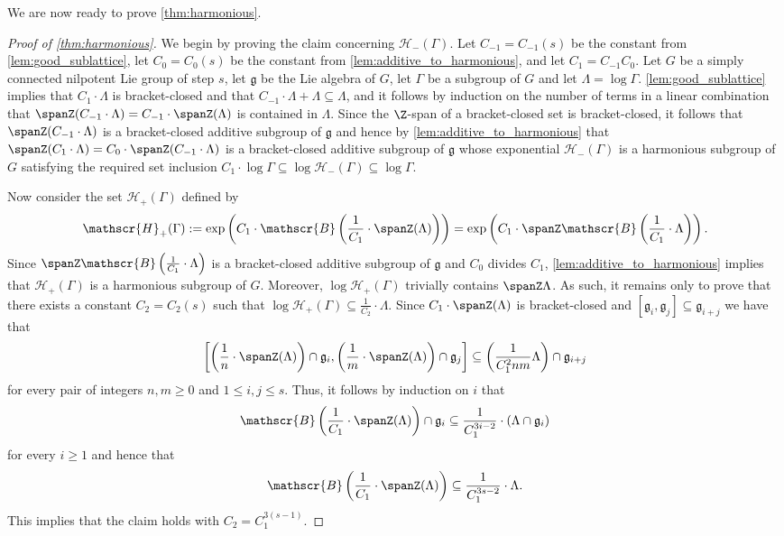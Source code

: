 We are now ready to prove \cref{thm:harmonious}.

\begin{proof}[Proof of \cref{thm:harmonious}]
We begin by proving the claim concerning $\mathscr{H}_-(\Gamma)$.
 Let $C_{-1}=C_{-1}(s)$ be the constant from \cref{lem:good_sublattice}, let $C_0=C_0(s)$ be the constant from \cref{lem:additive_to_harmonious}, and let $C_1=C_{-1}C_0$.
 Let $G$ be a simply connected nilpotent Lie group of step $s$, let $\mathfrak{g}$ be the Lie algebra of $G$, let $\Gamma$ be a subgroup of $G$ and let $\Lambda = \log \Gamma$.
  \cref{lem:good_sublattice} implies that $C_1 \cdot \Lambda$ is bracket-closed and that $C_{-1}\cdot \Lambda + \Lambda \subseteq \Lambda$, and it follows by induction on the number of terms in a linear combination that $\spanZ(C_{-1}\cdot \Lambda)=C_{-1}\cdot \spanZ(\Lambda)$ is contained in $\Lambda$. 
Since the $\Z$-span of a bracket-closed set is bracket-closed, it follows that $\spanZ(C_{-1} \cdot \Lambda)$ is a bracket-closed additive subgroup of $\mathfrak{g}$ and hence by \cref{lem:additive_to_harmonious} that $\spanZ (C_1 \cdot \Lambda)=C_0\cdot \spanZ(C_{-1}\cdot \Lambda)$ is a bracket-closed additive subgroup of $\mathfrak{g}$ whose exponential $\mathscr{H}_-(\Gamma)$ is a harmonious subgroup of $G$ satisfying the required set inclusion $C_1 \cdot \log \Gamma \subseteq \log \mathscr{H}_-(\Gamma) \subseteq \log \Gamma$.

\medskip

Now consider the set $\mathscr{H}_+(\Gamma)$ defined by
\[\mathscr{H}_+(\Gamma):=\exp\left(C_1 \cdot \mathscr{B}\left(\frac{1}{C_1} \cdot \spanZ (\Lambda)\right)\right)=\exp\left(C_1 \cdot \spanZ \mathscr{B}\left(\frac{1}{C_1} \cdot \Lambda\right)\right).\]
%
 Since $\spanZ \mathscr{B}\left(\frac{1}{C_1} \cdot \Lambda\right)$ is a bracket-closed additive subgroup of $\mathfrak{g}$ and $C_0$ divides $C_1$, \cref{lem:additive_to_harmonious} implies that $\mathscr{H}_+(\Gamma)$ is a harmonious subgroup of $G$. Moreover, $\log \mathscr{H}_+(\Gamma)$ trivially contains $\spanZ \Lambda$. As such, it remains only to prove that there exists a constant $C_2=C_2(s)$ such that $\log \mathscr{H}_+(\Gamma) \subseteq \frac{1}{C_2} \cdot \Lambda$. Since $C_1\cdot \spanZ (\Lambda)$ is bracket-closed
 and $[\mathfrak{g}_i,\mathfrak{g}_j]\subseteq \mathfrak{g}_{i+j}$ we have that
 \[
\left[\left(\frac{1}{n}\cdot \spanZ(\Lambda)\right)\cap \mathfrak{g}_i, \left(\frac{1}{m}\cdot \spanZ(\Lambda)\right)\cap \mathfrak{g}_j\right] \subseteq \left(\frac{1}{C_1^2 nm} \Lambda\right) \cap \mathfrak{g}_{i+j}
 \]
 for every pair of integers $n,m \geq 0$ and $1 \leq i, j \leq s$. Thus, it follows by induction on $i$ that
 \[
\mathscr{B}\left(\frac{1}{C_1} \cdot \spanZ (\Lambda)\right) \cap \mathfrak{g}_i \subseteq \frac{1}{C_1^{3i-2}} \cdot (\Lambda \cap \mathfrak{g}_i)
 \]
for every $i\geq 1$ and hence that
 \[
\mathscr{B}\left(\frac{1}{C_1} \cdot \spanZ (\Lambda)\right) \subseteq \frac{1}{C_1^{3s-2}} \cdot \Lambda.
 \]
 This implies that the claim holds with $C_2=C_1^{3(s-1)}$.
\end{proof}

